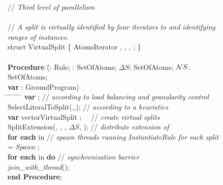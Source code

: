 \documentclass[preprint]{tlp}
\newcommand{\DNF}{\ensuremath{\Delta S}\xspace}
\newcommand{\NNF}{\ensuremath{{\cal N}S}\xspace}
\begin{document}
\begin{figure}[th!]
\begin{center}
\begin{small}
\begin{tabbing}

// {\em Third level of parallelism}\\ \
\\
// {\em A split is virtually identified by four iterators to  and  identifying ranges of instances. }\\
struct VirtualSplit
\{
AtomsIterator , , , ;
\}\\ \
\\
{\bf Procedure} \=(: Rule; : SetOfAtoms; \DNF: SetOfAtoms; \NNF: SetOfAtoms;\\
                                     \> {\bf var} : GroundProgram)\\
\hspace*{0.2cm} \= \kill
\hspace*{0.4cm} \= \hspace*{0.4cm} \= \hspace*{0.4cm} \=
\hspace*{0.4cm} \= \hspace*{0.4cm} \= \hspace*{3cm} \=\kill
\> {\bf var} ; // {\em  according to load balancing and granularity control} \\
\> SelectLiteralToSplit(,,); \hspace{0.82cm} // {\em  according to a heuristics} \\
\> {\bf var} vectorVirtualSplit ; \ \  // {\em  create virtual splits} \\
\> SplitExtension(, , , \DNF, ); \hspace{0.7 cm} // {\em  distribute extension of } \\
\> {\bf for each}  in  \hspace{2.05 cm}// {\em  spawn threads running InstantiateRule for each split} \\
\>\>  = {\em Spawn} ; \\
\> {\bf for each}  in  {\bf do} \hspace{1.5 cm} // {\em synchronization barrier} \\
\>\> {\em join\_with\_thread}(); \\
{\bf end Procedure}; \\

\\


\end{tabbing}
\end{small}
\end{center}
\end{figure}
\end{document}
